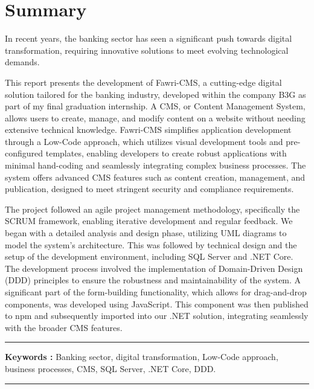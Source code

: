 \chapter*{Summary}

\hspace{\parindent}  In recent years, the banking sector has seen a significant push towards digital transformation, requiring innovative solutions to meet evolving technological demands.

This report presents the development of Fawri-CMS, a cutting-edge digital solution tailored for the banking industry, developed within the company B3G as part of my final graduation internship. A CMS, or Content Management System, allows users to create, manage, and modify content on a website without needing extensive technical knowledge. Fawri-CMS simplifies application development through a Low-Code approach, which utilizes visual development tools and pre-configured templates, enabling developers to create robust applications with minimal hand-coding and seamlessly integrating complex business processes. The system offers advanced CMS features such as content creation, management, and publication, designed to meet stringent security and compliance requirements.

The project followed an agile project management methodology, specifically the SCRUM
framework, enabling iterative development and regular feedback. We began with a detailed analysis and design phase, utilizing UML diagrams to model the system’s architecture. This was followed by technical design and the setup of the development environment, including SQL Server and .NET Core.
The development process involved the implementation of Domain-Driven Design (DDD) principles to ensure the robustness and maintainability of the system. A significant part of the form-building functionality, which allows for drag-and-drop components, was developed using JavaScript. This component was then published to npm and subsequently imported into our .NET solution, integrating seamlessly with the broader CMS features.

\noindent\rule[2pt]{\textwidth}{0.5pt}

\textbf{Keywords :}
Banking sector, digital transformation, Low-Code approach, business
processes, CMS, SQL Server, .NET Core, DDD.
\\
\noindent\rule[2pt]{\textwidth}{0.5pt}